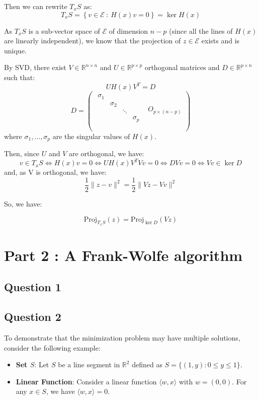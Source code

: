 \documentclass[12p]{article}
\newcommand*{\proj}{\text{Proj}}
\newcommand*{\es}{\mathcal{E}}
\begin{document}
Then we can rewrite \(T_xS\) as:
\[
  T_xS=\left\{v\in \es \ : \ H(x)v=0\right\} =\ker H(x)  
\]

As \(T_xS\) is a sub-vector space of \(\es\) of dimension \(n-p\) (since all the lines of \(H(x)\) are linearly independent), we know that the projection of \(z\in \es\) exists and is unique. 

By SVD, there exist \(V\in\mathbb{R}^{n\times n}\) and \(U\in\mathbb{R}^{p\times p}\) orthogonal matrices and \(D\in\mathbb{R}^{p\times n}\) such that:
\[
  UH(x)V^T=D
\]
\[
  D=\begin{pmatrix}
    \begin{matrix}
    \sigma_1 &  &  & \\
     & \sigma_2 &  & \\
     &  & \ddots & \\
     &  &  & \sigma_p\\
    \end{matrix} & O_{p\times(n-p)}\\
    \end{pmatrix}  
\]
where \(\sigma_1,\dots,\sigma_p\) are the singular values of \(H(x)\).

Then, since \(U\) and \(V\) are orthogonal, we have:
\[
  v\in T_xS\iff H(x)v=0\iff UH(x)V^TVv=0\iff DVv=0\iff Vv\in \ker D  
\]
and, as V is orthogonal, we have:
\[
  \frac{1}{2}\|z-v\|^2= \frac{1}{2}\|Vz-Vv\|^2  
\]

So, we have:

\[
  \proj_{T_xS}(z)= \proj_{\ker D}(Vz) 
\]

\newpage


\section*{Part 2 : A Frank-Wolfe algorithm} 


\subsection*{Question 1} 

\subsection*{Question 2} 
To demonstrate that the minimization problem may have multiple solutions, consider the following example:

\begin{itemize}
    \item \textbf{Set \( S \)}: Let \( S \) be a line segment in \( \mathbb{R}^2 \) defined as \( S = \{ (1, y) : 0 \leq y \leq 1 \} \).
    \item \textbf{Linear Function}: Consider a linear function \( \langle w, x \rangle \) with \( w = (0, 0) \). For any \( x \in S \), we have \( \langle w, x \rangle = 0 \).
\end{itemize}
\end{document}
